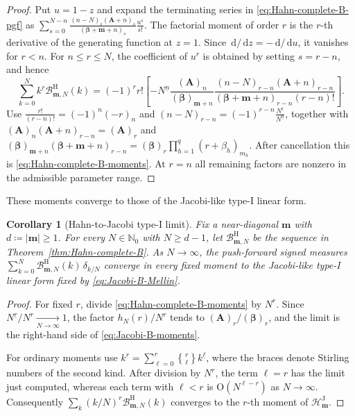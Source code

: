 \documentclass[10pt]{amsart}
\newcommand{\Nzero}{\mathbb N_0}
\newcommand{\dd}{\,\mathrm d}
\newcommand{\A}{\boldsymbol A}
\newcommand{\bbeta}{\boldsymbol\beta}
\newcommand{\mm}{\boldsymbol m}
\newcommand{\abs}[1]{\lvert#1\rvert}
\newcommand{\fall}[2]{#1^{\underline{#2}}}
\theoremstyle{plain}
\newtheorem{corollary}[theorem]{Corollary}
\theoremstyle{definition}
\theoremstyle{remark}
\begin{document}
\begin{proof}
Put \(u=1-z\) and expand the terminating series in
\eqref{eq:Hahn-complete-B-pgf} as
\(\sum_{s=0}^{N-n}
\frac{(n-N)_s(\A+n)_s}{(\bbeta+\mm+n)_s}\frac{u^s}{s!}\).
The factorial moment of order \(r\) is the \(r\)-th derivative of the
generating function at \(z=1\). Since \(\dd/\dd z=-\dd/\dd u\), it vanishes
for \(r<n\). For \(n\le r\le N\), the coefficient of \(u^r\) is obtained by
setting \(s=r-n\), and hence
\[
 \sum_{k=0}^N\fall{k}{r}\mathcal B_{\mm,N}^{\mathrm H}(k)
 =(-1)^r r!\left[-\fall{N}{n}
 \frac{(\A)_n}{(\bbeta)_{\mm+n}}
 \frac{(n-N)_{r-n}(\A+n)_{r-n}}
 {(\bbeta+\mm+n)_{r-n}(r-n)!}\right].
\]
Use \(\frac{r!}{(r-n)!}=(-1)^n(-r)_n\) and
\((n-N)_{r-n}=(-1)^{r-n}\frac{\fall{N}{r}}{\fall{N}{n}}\), together
with \((\A)_n(\A+n)_{r-n}=(\A)_r\) and
\((\bbeta)_{\mm+n}(\bbeta+\mm+n)_{r-n}
=(\bbeta)_r\prod_{h=1}^q(r+\beta_h)_{m_h}\).
After cancellation this is \eqref{eq:Hahn-complete-B-moments}. At \(r=n\)
all remaining factors are nonzero in the admissible parameter range.
\end{proof}

These moments converge to those of the Jacobi-like type-I linear form.

\begin{corollary}[Hahn-to-Jacobi type-I limit]
\label{cor:Hahn-Jacobi-dual}
Fix a near-diagonal \(\mm\) with \(d\coloneq\abs\mm\ge1\). For every
\(N\in\Nzero\) with \(N\ge d-1\), let
\(\mathcal B_{\mm,N}^{\mathrm H}\) be the sequence in
Theorem~\ref{thm:Hahn-complete-B}. As \(N\to\infty\), the push-forward
signed measures \(\sum_{k=0}^N\mathcal B_{\mm,N}^{\mathrm H}(k)
\,\delta_{k/N}\) converge in every fixed moment to the Jacobi-like type-I
linear form fixed by
\eqref{eq:Jacobi-B-Mellin}.
\end{corollary}

\begin{proof}
For fixed \(r\), divide \eqref{eq:Hahn-complete-B-moments} by \(N^r\).
Since \(\fall{N}{r}/N^r\xrightarrow[N\to\infty]{}1\), the factor
\(h_N(r)/N^r\) tends to
\((\A)_r/(\bbeta)_r\), and the limit is the right-hand side of
\eqref{eq:Jacobi-B-moments}.

For ordinary moments use
\(k^r=\sum_{\ell=0}^r
\genfrac\{\}{0pt}{}{r}{\ell}\fall{k}{\ell}\), where the braces denote
Stirling numbers of the second kind. After division
by \(N^r\), the term \(\ell=r\) has the limit just computed, whereas each
term with \(\ell<r\) is \(\mathrm O(N^{\ell-r})\) as
\(N\to\infty\). Consequently
\(\sum_k(k/N)^r\mathcal B_{\mm,N}^{\mathrm H}(k)\) converges to the \(r\)-th moment of
\(\mathcal H^{\mathrm J}_{\mm}\).
\end{proof}
\end{document}
